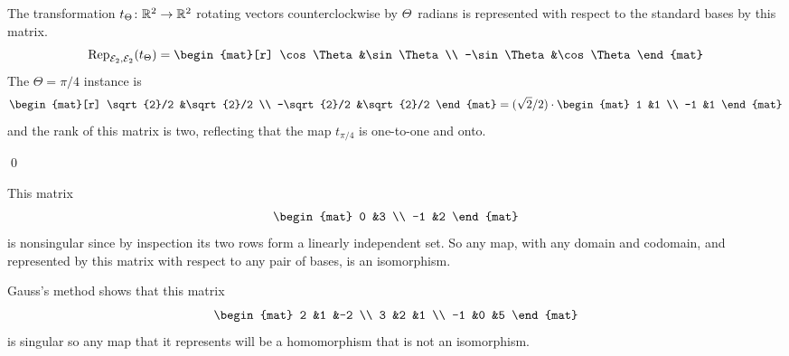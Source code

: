 \documentclass[10pt,t]{beamer}
\begin{document}
\begin{frame}
\ex
The transformation $\mbox{$t_\Theta\colon \mathbb{R}^2\to \mathbb{R}^2$}$ rotating vectors 
counterclockwise by $\Theta$~radians is represented with respect to the
standard bases by this matrix.
\begin{equation*}
  \rep{t_\Theta}{\stdbasis_2,\stdbasis_2}
  =
  \begin{mat}[r]
    \cos\Theta  &\sin\Theta  \\
   -\sin\Theta  &\cos\Theta
  \end{mat}
\end{equation*}
The $\Theta=\pi/4$ instance is
\begin{equation*}
  \begin{mat}[r]
    \sqrt{2}/2  &\sqrt{2}/2  \\
   -\sqrt{2}/2  &\sqrt{2}/2
  \end{mat}
  =(\sqrt{2}/2)\cdot
  \begin{mat}
    1  &1  \\
   -1  &1
  \end{mat}
\end{equation*}
and the rank of this matrix is two, reflecting
that the map $t_{\pi/4}$ is one-to-one and onto. 
\end{frame}




\begin{frame}
\df[df:NonsingularMap]




\pause
\lm[le:NonsingMatIffNonsingMap]
\pause
\pf
{}

\pause
{}
\qed
\end{frame}




\begin{frame}
\ex
This matrix
\begin{equation*}
  \begin{mat}
    0  &3  \\
   -1  &2
  \end{mat}
\end{equation*}
is nonsingular since by inspection its two rows form a linearly independent
set.
So any map, with any domain and codomain, and represented by this matrix  
with respect to any pair of bases,
is an isomorphism.

\pause
\ex
Gauss's method shows that this matrix
\begin{equation*}
  \begin{mat}
    2  &1  &-2  \\
    3  &2  &1   \\
   -1  &0  &5
  \end{mat}
\end{equation*}
is singular so any map that it represents will be a homomorphism that
is not an isomorphism.
\end{frame}




% 
\end{document}
